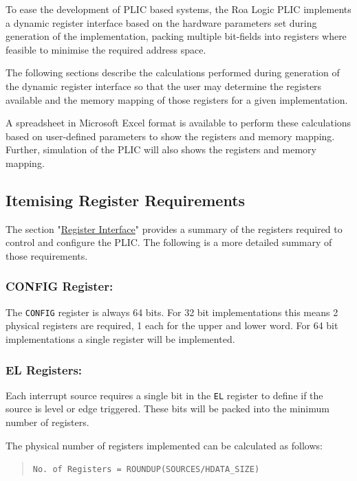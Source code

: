 To ease the development of PLIC based systems, the Roa Logic PLIC
implements a dynamic register interface based on the hardware parameters
set during generation of the implementation, packing multiple bit-fields
into registers where feasible to minimise the required address space.

The following sections describe the calculations performed during
generation of the dynamic register interface so that the user may
determine the registers available and the memory mapping of those
registers for a given implementation.

A spreadsheet in Microsoft Excel format is available to perform these
calculations based on user-defined parameters to show the registers and
memory mapping. Further, simulation of the PLIC will also shows the
registers and memory mapping.

\subsection{Itemising Register Requirements}

The section "\protect\hyperlink{register-interface}{Register Interface}"
provides a summary of the registers required to control and configure
the PLIC. The following is a more detailed summary of those
requirements.

\subsubsection{CONFIG Register:}

The \texttt{CONFIG} register is always 64 bits. For 32 bit
implementations this means 2 physical registers are required, 1 each for
the upper and lower word. For 64 bit implementations a single register
will be implemented.

\subsubsection{EL Registers:}

Each interrupt source requires a single bit in the \texttt{EL} register
to define if the source is level or edge triggered. These bits will be
packed into the minimum number of registers.

The physical number of registers implemented can be calculated as
follows:

\begin{quote}
\texttt{No.\ of\ Registers\ =\ ROUNDUP(SOURCES/HDATA\_SIZE)}
\end{quote}

